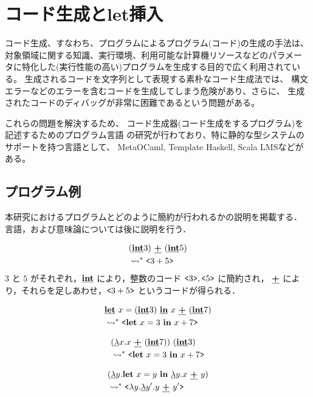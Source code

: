 
\section{コード生成とlet挿入}

コード生成、すなわち、プログラムによるプログラム(コード)の生成の手法は、
対象領域に関する知識、実行環境、利用可能な計算機リソースなどのパラメー
タに特化した(実行性能の高い)プログラムを生成する目的で広く利用されている。
生成されるコードを文字列として表現する素朴なコード生成法では、
構文エラーなどのエラーを含むコードを生成してしまう危険があり、さらに、
生成されたコードのディバッグが非常に困難であるという問題がある。

これらの問題を解決するため、
コード生成器(コード生成をするプログラム)を記述するためのプログラム言語
の研究が行わており、特に静的な型システムのサポートを持つ言語として、
MetaOCaml, Template Haskell, Scala LMSなどがある。



\subsection{プログラム例}
本研究におけるプログラムとどのように簡約が行われるかの説明を掲載する．
言語，および意味論については後に説明を行う．

\begin{align}
  & (\underline{\textbf{int}} 3)~ \underline{\textbf{+}}~ (\underline{\textbf{int}} 5) \\
  & \leadsto^* \texttt{<}{3 + 5}\texttt{>} \nonumber
\end{align}
$3$ と $5$ がそれぞれ，$\underline{\textbf{int}}$ により，整数のコード $\texttt{<}{3}\texttt{>},\texttt{<}{5}\texttt{>}$ に簡約され，
$\underline{\textbf{+}}$ により，それらを足しあわせ，$\texttt{<}{3 + 5}\texttt{>}$ というコードが得られる．

\begin{align}
  & \underline{\textbf{let}}~ x = (\underline{\textbf{int}}{3})~ \underline{\textbf{in}}~ x~ \underline{\textbf{+}}~ (\underline{\textbf{int}} 7)  \\
  & \leadsto^* \texttt{<}{\textbf{let}~ x = 3~ \textbf{in}~ x + 7}\texttt{>} \nonumber
\end{align}


\begin{align}
  & (\underline{\lambda}{x}.{x~ \underline{\textbf{+}}~ (\underline{\textbf{int}} 7))~}{(\underline{\textbf{int}} 3)} \\
  & \leadsto^* \texttt{<}{\textbf{let}~ x = 3~ \textbf{in}~ x + 7}\texttt{>} \nonumber
\end{align}

\begin{align}
  & (\underline{\lambda}{y}.{\textbf{let}~ x = y~ \textbf{in}~ \underline{\lambda}{y}.{x~ \underline{\textbf{+}}~ y}{}}{}) \\
  & \leadsto^* \texttt{<}{\lambda{y}.{\underline{\lambda}{y'}.{}{}}{y~ \underline{\textbf{+}}~ y'}}\texttt{>} \nonumber
\end{align}

